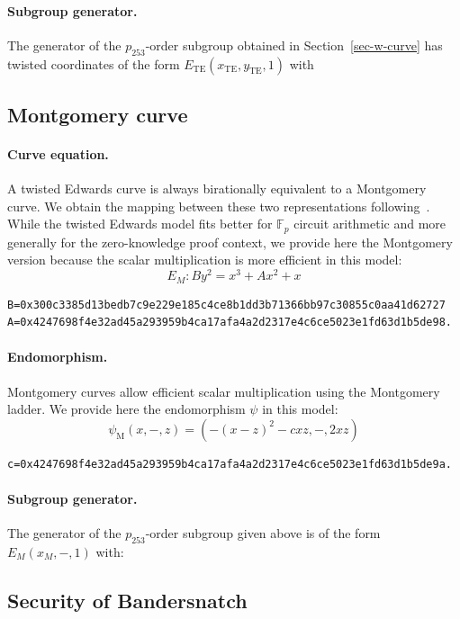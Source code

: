\documentclass{article}
\theoremstyle{definition}
\begin{document}
\paragraph{Subgroup generator.}
The generator of the $p_{253}$-order subgroup obtained in
Section~\ref{sec-w-curve} has twisted coordinates
of the form $E_\text{TE}(x_\text{TE},y_\text{TE},1)$ with


\subsection{Montgomery curve}
\paragraph{Curve equation.}
A twisted Edwards curve is always birationally equivalent to a
Montgomery curve. We obtain the mapping between these two
representations following~\cite{JCEng:CosSmi18}.
While the twisted Edwards model fits better for $\mathbb F_p$ circuit
arithmetic and more generally for the zero-knowledge proof context, we
provide here the Montgomery version because the scalar multiplication
is more efficient in this model:
$$E_M: By^2 = x^3 + Ax^2 + x$$
\begin{verbatim}
B=0x300c3385d13bedb7c9e229e185c4ce8b1dd3b71366bb97c30855c0aa41d62727
A=0x4247698f4e32ad45a293959b4ca17afa4a2d2317e4c6ce5023e1fd63d1b5de98.
\end{verbatim}

\paragraph{Endomorphism.}
Montgomery curves allow efficient scalar multiplication using the
Montgomery ladder. We provide here the endomorphism $\psi$ in this
model:
$$\psi_\text{M}(x,-,z) = (-(x-z)^2 - cxz, -, 2xz)$$
\begin{verbatim}
c=0x4247698f4e32ad45a293959b4ca17afa4a2d2317e4c6ce5023e1fd63d1b5de9a.
\end{verbatim}

\paragraph{Subgroup generator.}
The generator of the $p_{253}$-order subgroup given above is of the
form $E_M(x_M,-,1)$ with:


\subsection{Security of Bandersnatch}
\end{document}
